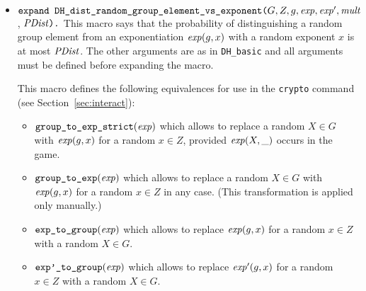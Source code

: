 \documentclass{article}
\begin{document}
\begin{itemize}
\begin{itemize}
\begin{itemize}
     \item $\texttt{expand\ DH\_dist\_random\_group\_element\_vs\_exponent(}G,
     Z, g, \vn{exp}, \vn{exp}', \vn{mult}$, $\mathit{PDist}\texttt{).}$ This macro says
     that the probability of distinguishing a random group element
     from an exponentiation $\mathit{exp}(g,x)$ with a random exponent $x$
     is at most $\mathit{PDist}$.  The other arguments are as in
     \texttt{DH\_basic} and all arguments must be defined before 
     expanding the macro.

   This macro defines the following equivalences for use in the
   \texttt{crypto} command (see Section~\ref{sec:interact}):
   \begin{itemize}
   \item $\texttt{group\_to\_exp\_strict}(\mathit{exp})$ which allows to replace
     a random $X \in G$ with $\mathit{exp}(g,x)$ for a random $x \in Z$, provided
     $\mathit{exp}(X,\_)$ occurs in the game.
   \item $\texttt{group\_to\_exp}(\mathit{exp})$ which allows to replace
     a random $X \in G$ with $\mathit{exp}(g,x)$ for a random $x \in Z$ in any case.
     (This transformation is applied only manually.)
   \item $\texttt{exp\_to\_group}(\mathit{exp})$ which allows to replace
     $\mathit{exp}(g,x)$ for a random $x \in Z$ with a random $X \in G$.
   \item $\texttt{exp'\_to\_group}(\mathit{exp})$ which allows to replace
     $\mathit{exp'}(g,x)$ for a random $x \in Z$ with a random $X \in G$.
   \end{itemize}


\end{itemize}
\end{itemize}
\end{itemize}
\end{document}
